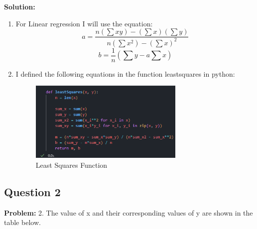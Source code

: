 \documentclass[a4paper,12pt]{article}
\begin{document}
\textbf{Solution:}
\begin{enumerate}
    \item For Linear regression I will use the equation: 
\[
a = \frac{n(\sum xy) - (\sum x)(\sum y)}{n(\sum x^2) - (\sum x)^2}
\]
\[
b = \frac{1}{n}(\sum y - a\sum x)
\]
\item I defined the following equations in the function leastsquares in python:
\begin{figure}[H]
    \centering
    \includegraphics[width=0.7\textwidth]{leastSquaresFunction.png}
    \caption{Least Squares Function}
    \label{fig:least_squares_function}
\end{figure}
\end{enumerate}

\newpage
\subsection{Question 2}
\textbf{Problem:} 2. The value of x and their corresponding values of y are shown in the table below.
\end{document}
